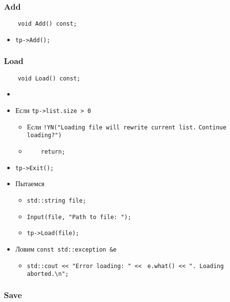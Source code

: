 \subsubsection*{Add}

\begin{lstlisting}
	void Add() const;
\end{lstlisting}

\begin{itemize}
	\item \verb|tp->Add();|
\end{itemize}


\subsubsection*{Load}

\begin{lstlisting}
	void Load() const;
\end{lstlisting}

\begin{itemize}
	\item \verb||
	
	\item Если \verb|tp->list.size > 0|
		\begin{itemize}
			\item Если \verb|!YN("Loading file will rewrite current list.| 
			\verb|Continue loading?")|
			\item \verb|    return;|
		\end{itemize}
    \item \verb|tp->Exit();|
	\item Пытаемся
		\begin{itemize}
			\item \verb|std::string file;|
			\item \verb|Input(file, "Path to file: ");|
			\item \verb|tp->Load(file);|
		\end{itemize}
	\item Ловим \verb|const std::exception &e|
		\begin{itemize}
			\item \verb|std::cout << "Error loading: " << |
			\verb|e.what() << ". Loading aborted.\n";|
		\end{itemize}
\end{itemize}


\subsubsection*{Save}

